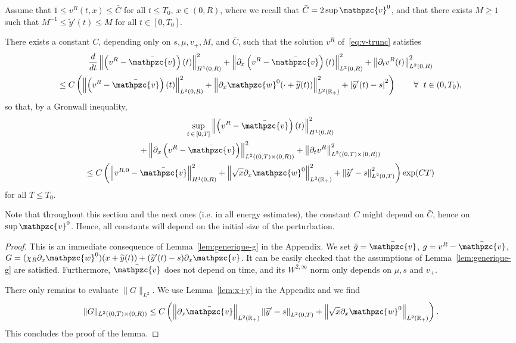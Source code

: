 \documentclass[AHL,Unicode,longabstracts,published]{cedram}
\newcommand{\R}{\mathbb{R}}
\newcommand{\p}{\partial}
\newcommand{\bv}{\bar{\mathpzc{v}}}
\newcommand{\tv}{\mathpzc{v}}
\newcommand{\tw}{\mathpzc{w}}
\newcommand{\ty}{\widetilde{y}}
\let\oldforall\forall
\renewcommand*{\forall}{\mathrel{\oldforall}}
\begin{document}
\begin{lemm}\label{lem:vR_L2}
Assume that $1\leq v^R(t,x)\leq \bar C$ for all $t \leq T_0, \ x \in (0,R)$, where we recall that $\bar C=2 \sup \tv^0$, and that there exists $M\geq 1$ such that $M^{-1}\leq \ty'(t)\leq M$ for all $t \in [0,T_0]$.

There exists a constant $C$, depending only on $s,\mu, v_+, M$, and $\bar C$, such that the solution $v^R$ of~\eqref{eq:v-trunc} satisfies
\begin{multline}\label{eq:E1-v0}
 \dfrac{d}{dt} \left\|\left(v^R-\bv\right)(t)\right\|_{H^1(0,R)}^2 + \left\|\partial_x \left(v^R-\bv\right)(t) \right\|_{L^2(0,R)}^2 + \left\|\partial_t v^R(t) \right\|_{L^2(0,R)}^2\\
 \leq C \left(\left\|\left(v^R-\bv\right)(t) \right\|_{L^2(0,R)}^2 + \left\|\partial_x\tw^0(\cdot +\ty(t))\right\|_{L^2(\R_+)}^2 + \left|\ty'(t) -s\right|^2\right) \qquad \forall \ t \in (0,T_0),
\end{multline}
so that, by a Gronwall inequality,
\begin{multline}\label{eq:est-H1-vR}
\sup_{t\, \in\,[0,T]} \left\|\left(v^R-\bv\right)(t)\right\|_{H^1(0,R)}^2\\
+ \left\|\partial_x \left(v^R-\bv\right) \right\|_{L^2((0,T)\times (0,R))}^2 + \left\|\partial_t v^R \right\|_{L^2((0,T)\times (0,R))}^2\\
\leq C \left(\left\|v^{R,0} -\bv\right\|_{H^1(0,R)}^2 + \left\|\sqrt{x} \partial_x\tw^0\right\|_{L^2(\R_+)}^2 + \left\|\ty'-s\right\|_{L^2(0,T)}^2 \right)\exp(C T)
\end{multline}
for all $T \leq T_0$.
\end{lemm}

\begin{rema}
Note that throughout this section and the next ones (i.e. in all energy estimates), the constant $C$ might depend on $\bar C$, hence on $\sup \tv^0$. Hence, all constants will depend on the initial size of the perturbation.
\end{rema}


\begin{proof}
This is an immediate consequence of Lemma~\ref{lem:generique-g} in the Appendix. We set $\bar g =\bar \tv$, $g=v^R-\bar \tv$, $G=(\chi_R \p_x\tw^0)(x+\ty(t)) + (\ty'(t)-s)\p_x\bar \tv$. It can be easily checked that the assumptions of Lemma~\ref{lem:generique-g} are satisfied. Furthermore, $\bar \tv$ does not depend on time, and its $W^{2,\infty}$ norm only depends on $\mu, s$ and $v_+$.

There only remains to evaluate $\|G\|_{L^2}$. We use Lemma~\ref{lem:x+y} in the Appendix and we find
\[
\|G\|_{L^2((0,T)\times (0,R))}\leq C\left(\left\|\partial_x \bv\right\|_{L^2(\R_+)}\left\|\ty' -s\right\|_{L^2(0,T)} + \left\|\sqrt{x} \partial_x\tw^0\right\|_{L^2(\R_+)}\right).
\]
This concludes the proof of the lemma.
\end{proof}
\end{document}
